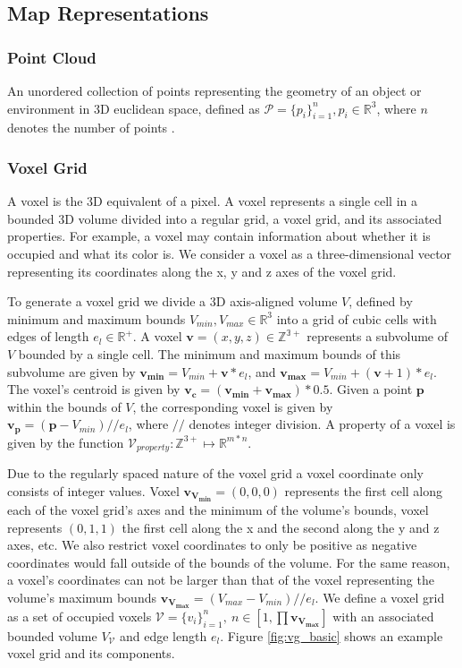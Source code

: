 \subsection{Map Representations}

\subsubsection{Point Cloud}
An unordered collection of points representing the geometry of an object or environment in 3D euclidean space, defined as \(\mathcal{P}=\{p_i\}_{i=1}^n, p_i \in \mathbb{R}^3\), where \(n\) denotes the number of points \citep{volodine_point_2007}.

\subsubsection{Voxel Grid}
A voxel is the 3D equivalent of a pixel. A voxel represents a single cell in a bounded 3D volume divided into a regular grid, a voxel grid, and its associated properties. For example, a voxel may contain information about whether it is occupied and what its color is. We consider a voxel as a three-dimensional vector representing its coordinates along the x, y and z axes of the voxel grid. 

To generate a voxel grid we divide a 3D axis-aligned volume \(V\), defined by minimum and maximum bounds \(V_{min}, V_{max} \in \mathbb{R}^{3}\) into a grid of cubic cells with edges of length \(e_{l} \in \mathbb{R}^+\). A voxel $\boldsymbol{v} = (x, y, z) \in \mathbb{Z^{3+}}$ represents a subvolume of \(V\) bounded by a single cell. The minimum and maximum bounds of this subvolume are given by \(\boldsymbol{v_{min}} = V_{min} + \boldsymbol{v}*e_{l}\), and \(\boldsymbol{v_{max}} = V_{min} + (\boldsymbol{v}+1)*e_{l}\). The voxel's centroid is given by \(\boldsymbol{v_c} = (\boldsymbol{v_{min}} + \boldsymbol{v_{max}})*0.5\). Given a point \(\boldsymbol{p}\) within the bounds of \(V\), the corresponding voxel is given by \(\boldsymbol{v_p} = (\boldsymbol{p} - V_{min})//e_l\), where \(//\) denotes integer division. A property of a voxel is given by the function \(\mathcal{V}_{property}: \mathbb{Z}^{3+} \mapsto \mathbb{R}^{m*n}\).

Due to the regularly spaced nature of the voxel grid a voxel coordinate only consists of integer values. Voxel \(\boldsymbol{v_{V_{min}}} = (0,0,0)\) represents the first cell along each of the voxel grid's axes and the minimum of the volume's bounds, voxel represents \((0,1,1)\) the first cell along the x and the second along the y and z axes, etc. We also restrict voxel coordinates to only be positive as negative coordinates would fall outside of the bounds of the volume. For the same reason, a voxel's coordinates can not be larger than that of the voxel representing the volume's maximum bounds \(\boldsymbol{v_{V_{max}}} = (V_{max} - V_{min})//e_l\). We define a voxel grid as a set of occupied voxels \(\mathcal{V}=\{v_{i}\}_{i=1}^{n},\ n \in [1, \prod{\boldsymbol{v_{V_{max}}}}]\) with an associated bounded volume \(V_{\mathcal{V}}\) and edge length \(e_{l}\). Figure \ref{fig:vg_basic} shows an example voxel grid and its components.

